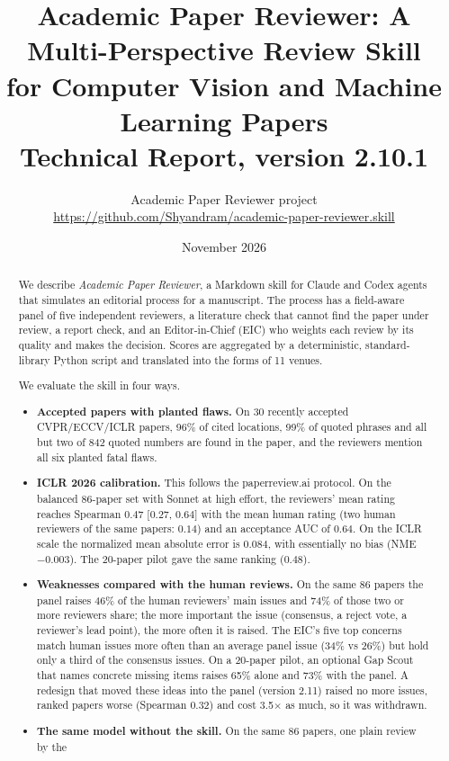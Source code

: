 \documentclass[11pt,a4paper]{article}
\title{Academic Paper Reviewer: A Multi-Perspective Review Skill\\
for Computer Vision and Machine Learning Papers\\[4pt]
\large Technical Report, version 2.10.1}
\author{Academic Paper Reviewer project\\
\small\url{https://github.com/Shyandram/academic-paper-reviewer.skill}}
\date{November 2026}
\begin{document}
\maketitle

\begin{abstract}
We describe \emph{Academic Paper Reviewer}, a Markdown skill for Claude and Codex agents that
simulates an editorial process for a manuscript. The process has a field-aware panel of five
independent reviewers, a literature check that cannot find the paper under review, a report check,
and an Editor-in-Chief (EIC) who weights each review by its quality and makes the decision.
Scores are aggregated by a deterministic, standard-library Python script and translated into the
forms of 11 venues.

We evaluate the skill in four ways.
\begin{itemize}
\item \textbf{Accepted papers with planted flaws.} On 30 recently accepted CVPR/ECCV/ICLR papers,
96\% of cited locations, 99\% of quoted phrases and all but two of 842 quoted numbers are found in the
paper, and the reviewers mention all six planted fatal flaws.
\item \textbf{ICLR 2026 calibration.} This follows the paperreview.ai protocol. On the balanced
86-paper set with Sonnet at high effort, the reviewers' mean rating reaches Spearman $0.47$
[$0.27$, $0.64$] with the mean human rating (two human reviewers of the same papers: $0.14$) and
an acceptance AUC of $0.64$. On the ICLR scale the normalized mean absolute error is $0.084$,
with essentially no bias (NME $-0.003$). The 20-paper pilot gave the same ranking ($0.48$).
\item \textbf{Weaknesses compared with the human reviews.} On the same 86 papers the panel
raises 46\% of the human reviewers' main issues and 74\% of those two or more reviewers share;
the more important the issue (consensus, a reject vote, a reviewer's lead point), the more often
it is raised. The EIC's five top concerns match human issues more often than an average panel
issue (34\% vs 26\%) but hold only a third of the consensus issues. On a 20-paper pilot, an
optional Gap Scout that names concrete missing items raises 65\% alone and 73\% with the panel.
A redesign that moved these ideas into the panel (version 2.11) raised no more issues, ranked
papers worse (Spearman $0.32$) and cost 3.5$\times$ as much, so it was withdrawn.
\item \textbf{The same model without the skill.} On the same 86 papers, one plain review by the

\end{itemize}
\end{abstract}
\end{document}
